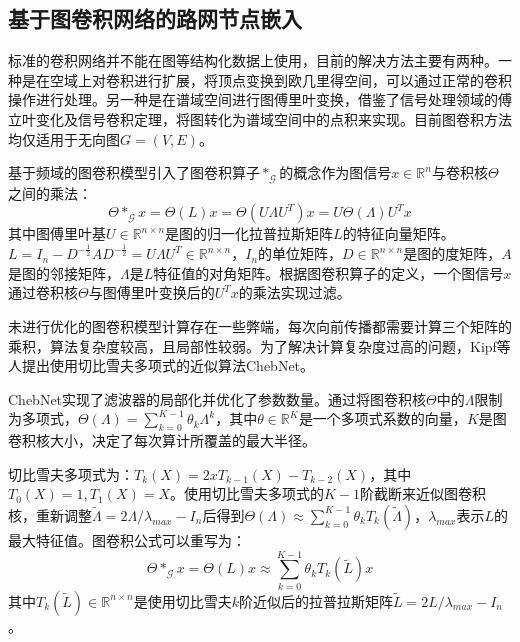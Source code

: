 \documentclass[master]{thesis-uestc}
\begin{document}
\subsection{基于图卷积网络的路网节点嵌入}
标准的卷积网络并不能在图等结构化数据上使用，目前的解决方法主要有两种。一种是在空域上对卷积进行扩展，将顶点变换到欧几里得空间，可以通过正常的卷积操作进行处理。另一种是在谱域空间进行图傅里叶变换，借鉴了信号处理领域的傅立叶变化及信号卷积定理，将图转化为谱域空间中的点积来实现。目前图卷积方法均仅适用于无向图$G=(V,E)$。

基于频域的图卷积模型引入了图卷积算子$\ast_{\mathcal{G}}$的概念作为图信号$x \in \mathbb{R}^n$与卷积核$\Theta$之间的乘法：
\begin{equation}
\Theta \ast_{\mathcal{G}} x=\Theta(L)x=\Theta(U \Lambda U^T)x=U \Theta(\Lambda)U^T x
\end{equation}
其中图傅里叶基$U\in \mathbb{R}^{n \times n}$是图的归一化拉普拉斯矩阵$L$的特征向量矩阵。$L=I_n-D^{-\frac{1}{2}}AD^{-\frac{1}{2}}=U\Lambda U^T \in \mathbb{R}^{n \times n}$，$I_n$的单位矩阵，$D\in \mathbb{R}^{n \times n}$是图的度矩阵，$A$是图的邻接矩阵，$\Lambda$是$L$特征值的对角矩阵。根据图卷积算子的定义，一个图信号$x$通过卷积核$\Theta$与图傅里叶变换后的$U^T x$的乘法实现过滤。

未进行优化的图卷积模型计算存在一些弊端，每次向前传播都需要计算三个矩阵的乘积，算法复杂度较高，且局部性较弱。为了解决计算复杂度过高的问题，Kipf等人提出使用切比雪夫多项式的近似算法ChebNet。

ChebNet实现了滤波器的局部化并优化了参数数量。通过将图卷积核$\Theta$中的$\Lambda$限制为多项式，$\Theta(\Lambda)=\sum^{K-1}_{k=0}\theta_k \Lambda^k$，其中$\theta \in \mathbb{R}^K$是一个多项式系数的向量，$K$是图卷积核大小，决定了每次算计所覆盖的最大半径。

切比雪夫多项式为：$T_k(X)=2xT_{k-1}(X)-T_{k-2}(X)$，其中$T_0(X)=1,T_1(X)=X$。使用切比雪夫多项式的$K-1$阶截断来近似图卷积核，重新调整$\tilde{\Lambda}=2\Lambda / \lambda_{max}-I_n$后得到$\Theta(\Lambda) \approx \sum^{K-1}_{k=0}\theta_k T_k(\tilde{\Lambda})$，$\lambda_{max}$表示$L$的最大特征值。图卷积公式可以重写为：
\begin{equation}
\Theta \ast_{\mathcal{G}} x=\Theta(L)x \approx \sum\limits^{K-1}_{k=0}\theta_k T_k(\tilde{L}) x
\end{equation}
其中$T_k(\tilde{L}) \in \mathbb{R}^{n\times n}$是使用切比雪夫$k$阶近似后的拉普拉斯矩阵$\tilde{L}=2L/\lambda_{max}-I_n$。
\end{document}
